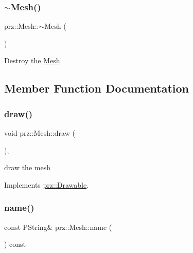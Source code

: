 \subsubsection{\texorpdfstring{$\sim$Mesh()}{~Mesh()}}
{\footnotesize\ttfamily prz\+::\+Mesh\+::$\sim$\+Mesh (\begin{DoxyParamCaption}{ }\end{DoxyParamCaption})\hspace{0.3cm}{\ttfamily [inline]}}



Destroy the \mbox{\hyperlink{classprz_1_1_mesh}{Mesh}}. 



\subsection{Member Function Documentation}
\mbox{\label{classprz_1_1_mesh_aed5a3cd6605bc59e29d6957a8f1a1131}} 
\subsubsection{\texorpdfstring{draw()}{draw()}}
{\footnotesize\ttfamily void prz\+::\+Mesh\+::draw (\begin{DoxyParamCaption}{ }\end{DoxyParamCaption})\hspace{0.3cm}{\ttfamily [override]}, {\ttfamily [virtual]}}



draw the mesh 



Implements \mbox{\hyperlink{classprz_1_1_drawable_aa6ca0ce45d4a00b69ecf47d5deb23825}{prz\+::\+Drawable}}.

\mbox{\label{classprz_1_1_mesh_ae2a7cec3a1cb7409ea2017cd729fe683}} 
\subsubsection{\texorpdfstring{name()}{name()}}
{\footnotesize\ttfamily const P\+String\& prz\+::\+Mesh\+::name (\begin{DoxyParamCaption}{ }\end{DoxyParamCaption}) const\hspace{0.3cm}{\ttfamily [inline]}}



